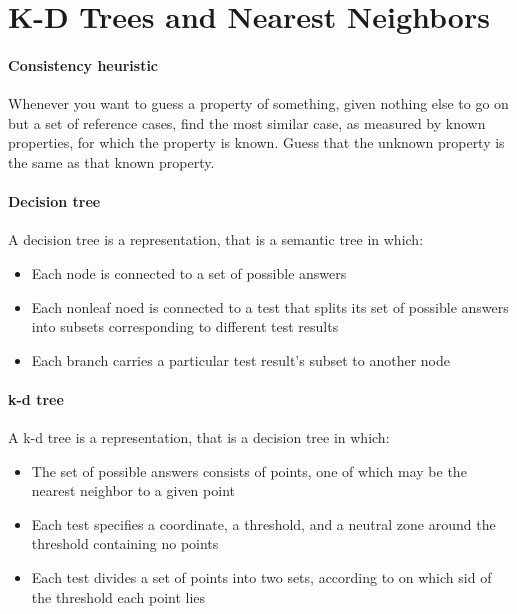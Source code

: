 \section{K-D Trees and Nearest Neighbors}

\paragraph{Consistency heuristic} Whenever you want to guess a
property of something, given nothing else to go on but a set of
reference cases, find the most similar case, as measured by known
properties, for which the property is known. Guess that the
unknown property is the same as that known property.

\paragraph{Decision tree} A decision tree is a representation,
that is a semantic tree in which:
\begin{itemize}
  \item Each node is connected to a set of possible answers
  \item Each nonleaf noed is connected to a test that splits its
    set of possible answers into subsets corresponding to
    different test results
  \item Each branch carries a particular test result's subset to
    another node
\end{itemize}

\paragraph{k-d tree} A k-d tree is a representation,
that is a decision tree in which:
\begin{itemize}
  \item The set of possible answers consists of points, one of
    which may be the nearest neighbor to a given point
  \item Each test specifies a coordinate, a threshold, and a
    neutral zone around the threshold containing no points
  \item Each test divides a set of points into two sets, according
    to on which sid of the threshold each point lies
\end{itemize}

